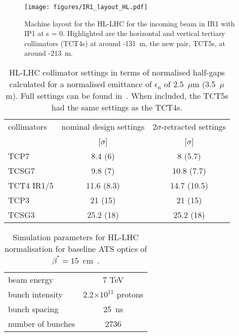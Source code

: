 \begin{figure}[!htb]
\begin{center}
\texttt{[image: figures/IR1\_layout\_HL.pdf]}
\end{center}
\vspace{-0.6cm}
 \caption{Machine layout for the HL-LHC for the incoming beam in IR1 with IP1 at s = 0. Highlighted are the horizontal and vertical tertiary collimators (TCT4s) at around -131~m, the new pair, TCT5s, at around -213~m.
  \label{hllhc_layout}}
\end{figure}


 \begin{table}%
   \centering
   \caption{HL-LHC collimator settings in terms of normalised half-gaps calculated for a normalised emittance of $\epsilon_{\mathrm{n}}$ of 2.5~$\mu$m (3.5~$\mu$m). Full settings can be found in~\cite{collSettRef}. When included, the TCT5s had the same settings as the TCT4s. }

   \begin{tabular}{l|c|c}
       \hline
       collimators &        nominal design settings & $2\sigma$-retracted settings\\
                   &         [$\sigma$] &  [$\sigma$]\\
       \hline
       TCP7 & 8.4 (6)& 8 (5.7) \\
       TCSG7 & 9.8 (7) & 10.8 (7.7) \\
       TCT4 IR1/5 & 11.6 (8.3) & 14.7 (10.5) \\
       TCP3 & 21 (15) & 21 (15) \\
       TCSG3 & 25.2 (18) & 25.2 (18)\\
       \hline
   \end{tabular}
   \label{HLcollSettings}
\end{table}

\begin{table}%
   \centering
   \caption{Simulation parameters for HL-LHC normalisation for baseline ATS optics of $\beta^* = 15$~cm~\cite{ATSref}.}
   \begin{tabular}{l|c}
       \hline
       beam energy & 7 TeV \\
       bunch intensity & 2.2$\times 10^{11}$ protons\\
       bunch spacing & 25~ns \\
       number of bunches & 2736 \\
       \hline
   \end{tabular}
   \label{hlscenario}
\end{table}



